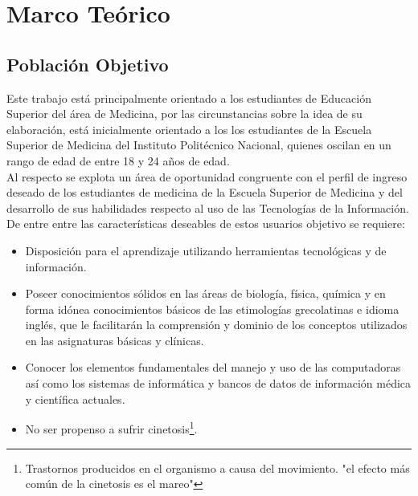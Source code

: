 \chapter{Marco Teórico}

\section{Poblaci\'on Objetivo}
Este trabajo está principalmente orientado a los estudiantes de Educación Superior del área de Medicina, 
por las circunstancias sobre la idea de su elaboración, está inicialmente orientado a los los estudiantes 
de la Escuela Superior de Medicina del Instituto Politécnico Nacional, quienes oscilan en un rango de edad 
de entre 18 y 24 años de edad.\\
Al respecto se explota un área de oportunidad congruente con el perfil de ingreso deseado de los estudiantes 
de medicina de la Escuela Superior de Medicina y del desarrollo de sus habilidades respecto al uso de las 
Tecnologías de la Información.\\
De entre entre las características deseables\cite{web5} de estos usuarios objetivo se requiere:
\begin{itemize}
	\item Disposición para el aprendizaje utilizando herramientas tecnológicas y de información.
	\item Poseer conocimientos sólidos en las áreas de biología, física, química y en forma idónea conocimientos básicos de las etimologías grecolatinas e idioma inglés, que le facilitarán la comprensión y dominio de los conceptos utilizados en las asignaturas básicas y clínicas.
	\item Conocer los elementos fundamentales del manejo y uso de las computadoras así como los sistemas de informática y bancos de datos de información médica y científica actuales.
	\item No ser propenso a sufrir cinetosis\footnote{Trastornos producidos en el organismo a causa del movimiento.	"el efecto más común de la cinetosis es el mareo"}.
\end{itemize}

